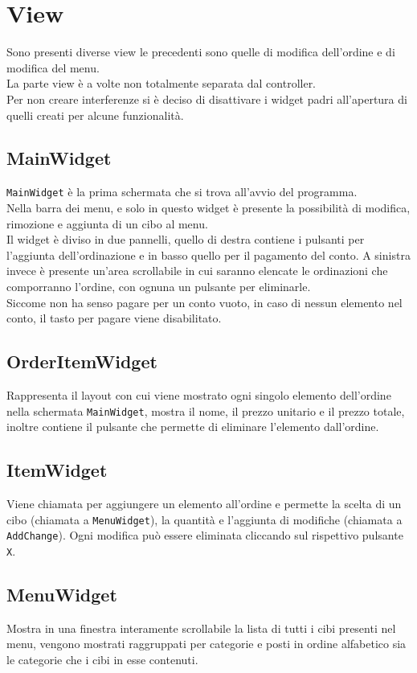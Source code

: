 \documentclass[]{report}   %
\begin{document}
\section{View}     						%
Sono presenti diverse view le precedenti sono quelle di modifica dell'ordine e di modifica del menu.\\
La parte view è a volte non totalmente separata dal controller.\\
Per non creare interferenze si è deciso di disattivare i widget padri all'apertura di quelli creati per alcune funzionalità.
\subsection{MainWidget}
\texttt{MainWidget} è la prima schermata che si trova all'avvio del programma.\\
Nella barra dei menu, e solo in questo widget è presente la possibilità di modifica, rimozione e aggiunta di un cibo al menu.\\
Il widget è diviso in due pannelli, quello di destra contiene i pulsanti per l'aggiunta dell'ordinazione e in basso quello per il pagamento del conto. A sinistra invece è presente un'area scrollabile in cui saranno elencate le ordinazioni che comporranno l'ordine, con ognuna un pulsante per eliminarle.\\
Siccome non ha senso pagare per un conto vuoto, in caso di nessun elemento nel conto, il tasto per pagare viene disabilitato.
\subsection{OrderItemWidget}
Rappresenta il layout con cui viene mostrato ogni singolo elemento dell'ordine nella schermata \texttt{MainWidget}, mostra il nome, il prezzo unitario e il prezzo totale, inoltre contiene il pulsante che permette di eliminare l'elemento dall'ordine.
\subsection{ItemWidget}
Viene chiamata per aggiungere un elemento all'ordine e permette la scelta di un cibo (chiamata a \texttt{MenuWidget}), la quantità e l'aggiunta di modifiche (chiamata a \texttt{AddChange}). Ogni modifica può essere eliminata cliccando sul rispettivo pulsante \texttt{X}.
\subsection{MenuWidget}
Mostra in una finestra interamente scrollabile la lista di tutti i cibi presenti nel menu, vengono mostrati raggruppati per categorie e posti in ordine alfabetico sia le categorie che i cibi in esse contenuti.\\
\end{document}
